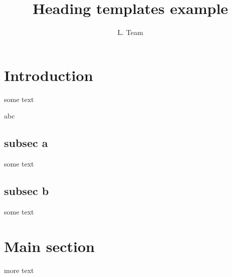 \documentclass{article}
\title{Heading templates example}
\author{L. Team}
\begin{document}
\maketitle
\section{Introduction}
some text

{%
  abc
}

\subsection{subsec a}
some text
\subsection{subsec b}
some text

\section{Main section}
more text
\end{document}
